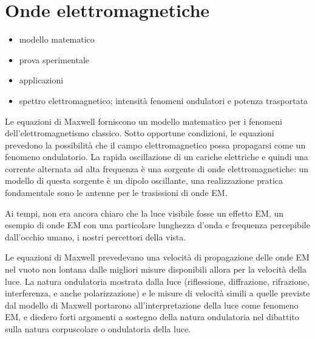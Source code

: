 \documentclass[letterpaper,10pt,italian]{jupyterBook}
\begin{document}
\chapter{Onde elettromagnetiche}
\label{\detokenize{ch/electromagnetism/em-waves:onde-elettromagnetiche}}\label{\detokenize{ch/electromagnetism/em-waves:physics-hs-electromagnetism-em-waves}}\label{\detokenize{ch/electromagnetism/em-waves::doc}}\begin{itemize}
\item {} 
\sphinxAtStartPar
modello matematico

\item {} 
\sphinxAtStartPar
prova sperimentale

\item {} 
\sphinxAtStartPar
applicazioni

\item {} 
\sphinxAtStartPar
spettro elettromagnetico; intensità fenomeni ondulatori e potenza trasportata

\end{itemize}

\sphinxAtStartPar
{} Le equazioni di Maxwell forniscono un modello matematico per i fenomeni dell’elettromagnetismo classico. Sotto opportune condizioni, le equazioni prevedono la possibilità che il campo elettromagnetico possa propagarsi come un fenomeno ondulatorio. La rapida oscillazione di un cariche elettriche \sphinxhyphen{} e quindi una corrente alternata ad alta frequenza \sphinxhyphen{} è una sorgente di onde elettromagnetiche: un modello di questa sorgente è un dipolo oscillante, una realizzazione pratica fondamentale sono le antenne per le trasissioni di onde EM.

\sphinxAtStartPar
Ai tempi, non era ancora chiaro che la luce visibile fosse un effetto EM, un esempio di onde EM con una particolare lunghezza d’onda e frequenza percepibile dall’occhio umano, i nostri percettori della vista.

\sphinxAtStartPar
Le equazioni di Maxwell prevedevano una velocità di propagazione delle onde EM nel vuoto non lontana dalle migliori misure disponibili allora per la velocità della luce. La natura ondulatoria mostrata dalla luce (riflessione, diffrazione, rifrazione, interferenza, e anche polarizzazione) e le misure di velocità simili a quelle previste dal modello di Maxwell portarono all’interpretazione della luce come fenomeno EM, e diedero forti argomenti a sostegno della natura ondulatoria nel dibattito sulla natura corpuscolare o ondulatoria della luce.
\end{document}
